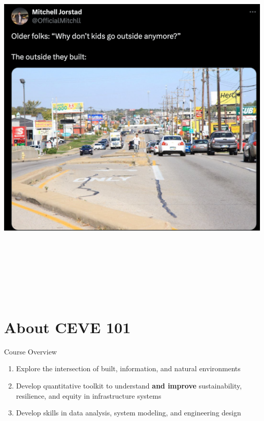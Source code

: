 \documentclass[
  ignorenonframetext,
]{beamer}
\providecommand{\tightlist}{%
  \setlength{\itemsep}{0pt}\setlength{\parskip}{0pt}}\usepackage{longtable,booktabs,array}
\begin{document}
\begin{frame}
\includegraphics[width=\textwidth,height=7.29167in]{outside-they-built.png}
\end{frame}

\section{About CEVE 101}\label{about-ceve-101}

\begin{frame}{Course Overview}
\label{course-overview}
\begin{enumerate}
\tightlist
\item
  Explore the intersection of built, information, and natural
  environments
\item
  Develop quantitative toolkit to understand \textbf{and improve}
  sustainability, resilience, and equity in infrastructure systems
\item
  Develop skills in data analysis, system modeling, and engineering
  design
\end{enumerate}
\end{frame}
\end{document}
